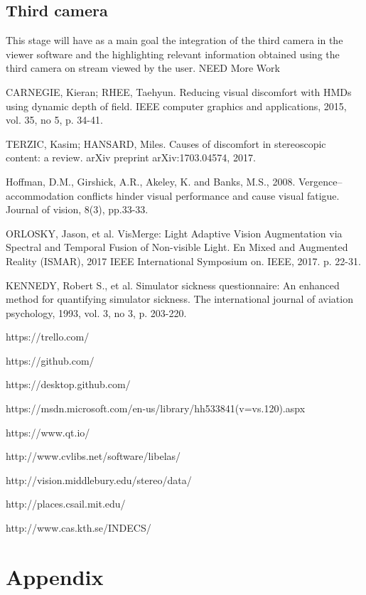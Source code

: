 \documentclass[10pt,a4paper,twocolumn,twoside]{article}
\begin{document}
\subsection{Third camera}
This stage will have as a main goal the integration of the third camera in the viewer software and the highlighting relevant information obtained using the third camera on stream viewed by the user. NEED More Work

\begin{thebibliography}{11}
CARNEGIE, Kieran; RHEE, Taehyun. Reducing visual discomfort with HMDs using dynamic depth of field. IEEE computer graphics and applications, 2015, vol. 35, no 5, p. 34-41.

TERZIC, Kasim; HANSARD, Miles. Causes of discomfort in stereoscopic content: a review. arXiv preprint arXiv:1703.04574, 2017.

Hoffman, D.M., Girshick, A.R., Akeley, K. and Banks, M.S., 2008. Vergence–accommodation conflicts hinder visual performance and cause visual fatigue. Journal of vision, 8(3), pp.33-33.

ORLOSKY, Jason, et al. VisMerge: Light Adaptive Vision Augmentation via Spectral and Temporal Fusion of Non-visible Light. En Mixed and Augmented Reality (ISMAR), 2017 IEEE International Symposium on. IEEE, 2017. p. 22-31.

KENNEDY, Robert S., et al. Simulator sickness questionnaire: An enhanced method for quantifying simulator sickness. The international journal of aviation psychology, 1993, vol. 3, no 3, p. 203-220.

https://trello.com/

https://github.com/

https://desktop.github.com/

https://msdn.microsoft.com/en-us/library/hh533841(v=vs.120).aspx

https://www.qt.io/

http://www.cvlibs.net/software/libelas/

http://vision.middlebury.edu/stereo/data/

http://places.csail.mit.edu/

http://www.cas.kth.se/INDECS/

\end{thebibliography}

\appendix

\section*{Appendix}
\end{document}
